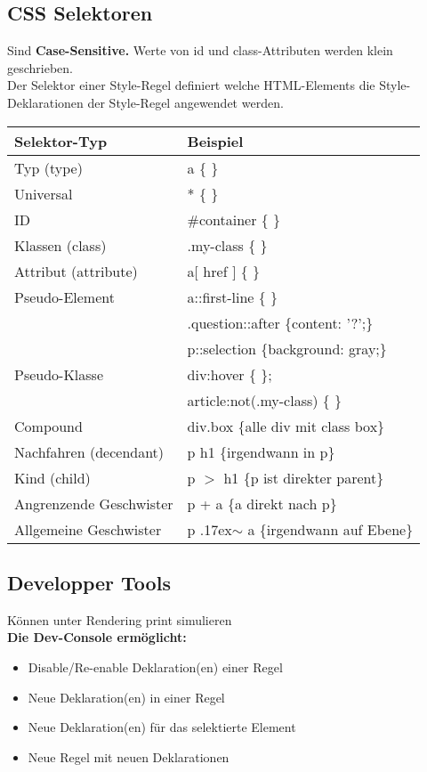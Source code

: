 \documentclass[7pt,landscape,a4paper]{scrartcl}
\begin{document}
\begin{multicols*}{4}
\subsection{CSS Selektoren}
	Sind \textbf{Case-Sensitive.} Werte von id und class-Attributen werden klein geschrieben.\\ 
	Der Selektor einer Style-Regel definiert welche HTML-Elements die Style-Deklarationen der Style-Regel angewendet werden.\\
	\begin{tabular}{|l|l}
		\hline
		\textbf{Selektor-Typ} & \textbf{Beispiel}\\
		\hline
		Typ (type) & a \{  \}\\
		\hline
		Universal & * \{  \}\\
		\hline
		ID & \#container \{  \}\\
		\hline
		Klassen (class) & .my-class \{  \}\\
		\hline
		Attribut (attribute) & a$[$ href $]$ \{  \}\\
		\hline
		Pseudo-Element & a::first-line \{  \}\\
		& .question::after \{content: '?';\}\\
		& p::selection \{background: gray;\}\\
		\hline
		Pseudo-Klasse & div:hover \{  \};\\
		& article:not(.my-class) \{  \}\\
		\hline
		Compound & div.box \{alle div mit class box\}\\
		\hline
		Nachfahren (decendant) & p h1 \{irgendwann in p\}\\
		\hline
		Kind (child) & p $>$ h1 \{p ist direkter parent\}\\
		\hline Angrenzende Geschwister & p + a \{a direkt nach p\}\\
		\hline Allgemeine Geschwister & p {\raise.17ex\hbox{$\scriptstyle\mathtt{\sim}$}} a \{irgendwann auf Ebene\}\\
		\hline
	\end{tabular}
\subsection{Developper Tools}
	Können unter Rendering print simulieren\\
	\textbf{Die Dev-Console ermöglicht:}
	\begin{itemize}[topsep=0pt, leftmargin=3mm]
		\setlength\itemsep{-0.3em}
		\item Disable/Re-enable Deklaration(en) einer Regel
		\item Neue Deklaration(en) in einer Regel
		\item Neue Deklaration(en) für das selektierte Element
		\item Neue Regel mit neuen Deklarationen
	\end{itemize}

\end{multicols*}
\end{document}

